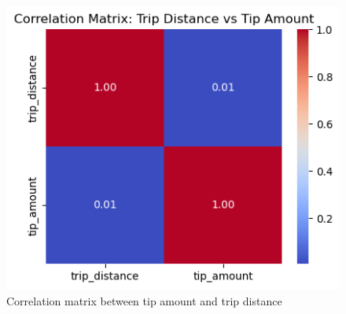 \documentclass[conference]{IEEEtran}
\begin{document}
\begin{figure}[h]
  \includegraphics[width=\linewidth]{eda-correlation-matrix.png}
  \centering
  \caption{Correlation matrix between tip amount and trip distance}
\end{figure}
\end{document}
